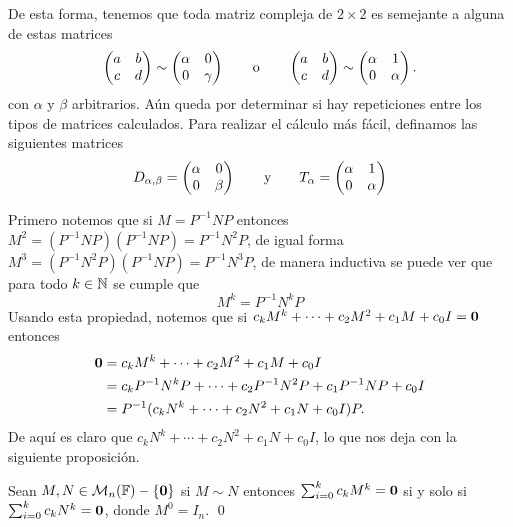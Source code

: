 De esta forma, tenemos que toda matriz compleja de $2 \times 2$ es semejante a alguna de estas matrices
\begin{equation}
  \begin{pmatrix} a & b \\ c & d \end{pmatrix} \sim \begin{pmatrix} \alpha & 0 \\ 0 & \gamma \end{pmatrix}
    \qquad\text{o}\qquad
    \begin{pmatrix} a & b \\ c & d \end{pmatrix} \sim \begin{pmatrix} \alpha & 1 \\ 0 & \alpha \end{pmatrix}.
      \label{eq:M2Form}
\end{equation}
con $\alpha$ y $\beta$ arbitrarios. Aún queda por determinar si hay repeticiones entre los tipos de matrices calculados. Para realizar el cálculo más fácil, definamos las siguientes matrices 
\[
  D_{\alpha,\beta} = \begin{pmatrix} \alpha & 0 \\ 0 & \beta \end{pmatrix}
     \qquad\text{y}\qquad
  T_\alpha = \begin{pmatrix} \alpha & 1 \\ 0 & \alpha \end{pmatrix}
\]

Primero notemos que si $M = P^{-1} N P$ entonces $M^2 = (P^{-1} N P)(P^{-1} N P) = P^{-1}N^2 P$, de igual forma $M^3 = (P^{-1}N^2 P) (P^{-1} N P) = P^{-1}N^3 P$, de manera inductiva se puede ver que para todo $k \in \mathbb{N}$ se cumple que
\[
  M^k = P^{-1} N^k P
\]
Usando esta propiedad, notemos que si $c_k M^k + \cdots + c_2 M^2 + c_1 M + c_0 I = \mathbf{0}$ entonces
\begin{align*}
  \mathbf{0} &= c_k M^k + \cdots + c_2 M^2 + c_1 M + c_0 I \\
    &= c_k P^{-1}N^k P + \cdots + c_2 P^{-1}N^2 P + c_1 P^{-1}N P + c_0 I \\
    &= P^{-1} (c_k N^k + \cdots + c_2 N^2 + c_1 N + c_0 I) P.
\end{align*}
De aquí es claro que $c_k N^k + \cdots + c_2 N^2 + c_1 N + c_0 I$, lo que nos deja con la siguiente proposición.

\begin{prop} \label{prop:MPolySem}
  Sean $M, N \in \mathcal{M}_n(\mathbb{F}) - \{\mathbf{0}\}$ si $M \sim N$ entonces $\sum_{i=0}^k c_k M^k = \mathbf{0}$ si y solo si $\sum_{i=0}^k c_k N^k = \mathbf{0}$, donde $M^0 = I_n$. \qed
\end{prop}

